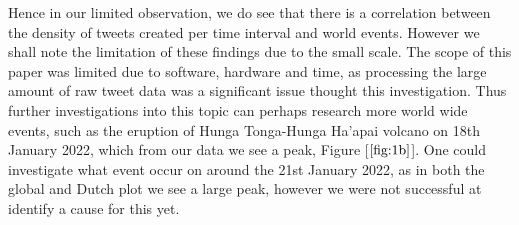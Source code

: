 \documentclass[10pt]{article}
\begin{document}
Hence in our limited observation, we do see that there is a correlation between the
density of tweets created per time interval and world events. However we shall note the
limitation of these findings due to the small scale. The scope of this paper was limited
due to software, hardware and time, as processing the large amount of raw tweet data was a
significant issue thought this investigation. Thus further investigations into this topic
can perhaps research more world wide events, such as the eruption of Hunga Tonga-Hunga Ha'apai
volcano on 18th January 2022, which from our data we see a peak, Figure [$\ref{fig:1b}$].
One could investigate what event occur on around the 21st January 2022, as in both the
global and Dutch plot we see a large peak, however we were not successful at identify a
cause for this yet.
\end{document}
